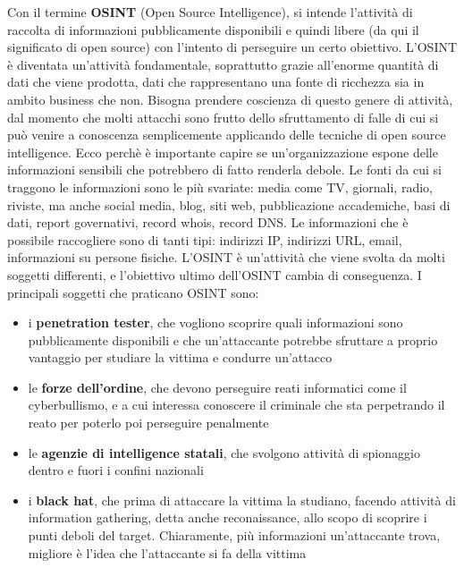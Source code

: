 \begin{flushleft}
Con il termine \textbf{OSINT} (Open Source Intelligence), si intende l'attività di raccolta di informazioni pubblicamente disponibili e quindi libere (da qui il significato di open source) con l'intento di perseguire un certo obiettivo. L'OSINT è diventata un'attività fondamentale, soprattutto grazie all'enorme quantità di dati che viene prodotta, dati che rappresentano una fonte di ricchezza sia in ambito business che non. Bisogna prendere coscienza di questo genere di attività, dal momento che molti attacchi sono frutto dello sfruttamento di falle di cui si può venire a conoscenza semplicemente applicando delle tecniche di open source intelligence. Ecco perchè è importante capire se un'organizzazione espone delle informazioni sensibili che potrebbero di fatto renderla debole. Le fonti da cui si traggono le informazioni sono le più svariate: media come TV, giornali, radio, riviste, ma anche social media, blog, siti web, pubblicazione accademiche, basi di dati, report governativi, record whois, record DNS. Le informazioni che è possibile raccogliere sono di tanti tipi: indirizzi IP, indirizzi URL, email, informazioni su persone fisiche. L'OSINT è un'attività che viene svolta da molti soggetti differenti, e l'obiettivo ultimo dell'OSINT cambia di conseguenza. I principali soggetti che praticano OSINT sono:


\begin{itemize}
    \item i \textbf{penetration tester}, che vogliono scoprire quali informazioni sono pubblicamente disponibili e che un'attaccante potrebbe sfruttare a proprio vantaggio per studiare la vittima e condurre un'attacco
    \item le \textbf{forze dell'ordine}, che devono perseguire reati informatici come il cyberbullismo, e a cui interessa conoscere il criminale che sta perpetrando il reato per poterlo poi perseguire penalmente
    \item le \textbf{agenzie di intelligence statali}, che svolgono attività di spionaggio dentro e fuori i confini nazionali
    \item i \textbf{black hat}, che prima di attaccare la vittima la studiano, facendo attività di information gathering, detta anche reconaissance, allo scopo di scoprire i punti deboli del target. Chiaramente, più informazioni un'attaccante trova, migliore è l'idea che l'attaccante si fa della vittima 
\end{itemize}



\end{flushleft}
